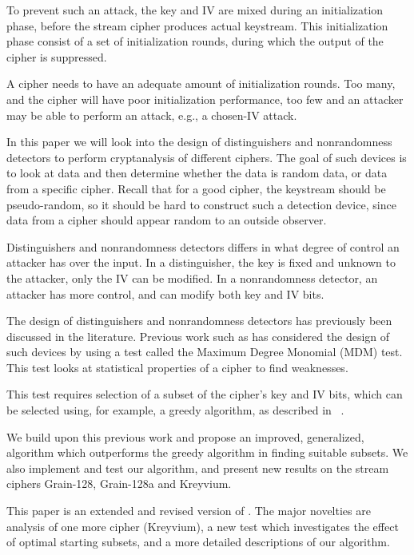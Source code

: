 {To prevent such an attack, the key and IV are mixed during an initialization phase, before the stream cipher produces actual keystream. This initialization phase consist of a set of initialization rounds, during which the output of the cipher is suppressed.

A cipher needs to have an adequate amount of initialization rounds. Too many, and the cipher will have poor initialization performance, too few and an attacker may be able to perform an attack, e.g., a chosen-IV attack.

In this paper we will look into the design of distinguishers and nonrandomness detectors to perform cryptanalysis of different ciphers. The goal of such devices is to look at data and then determine whether the data is random data, or data from a specific cipher. Recall that for a good cipher, the keystream should be pseudo-random, so it should be hard to construct such a detection device, since data from a cipher should appear random to an outside observer.

Distinguishers and nonrandomness detectors differs in what degree of control an attacker has over the input. In a distinguisher, the key is fixed and unknown to the attacker, only the IV can be modified. In a nonrandomness detector, an attacker has more control, and can modify both key and IV bits.

The design of distinguishers and nonrandomness detectors has previously been discussed in the literature. Previous work such as \cite{englund:2007} has considered the design of such devices by using a test called the Maximum Degree Monomial (MDM) test. This test looks at statistical properties of a cipher to find weaknesses.

This test requires selection of a subset of the cipher's key and IV bits, which can be selected using, for example, a greedy algorithm, as described in ~\cite{stankovski:2010}.

We build upon this previous work and propose an improved, generalized, algorithm which outperforms the greedy algorithm in finding suitable subsets. We also implement and test our algorithm, and present new results on the stream ciphers Grain-128, Grain-128a and Kreyvium.

This paper is an extended and revised version of \cite{karlsson:2017}.
The major novelties are analysis of one more cipher (Kreyvium), a new test which investigates the effect of optimal starting subsets, and a more detailed descriptions of our algorithm.

}
